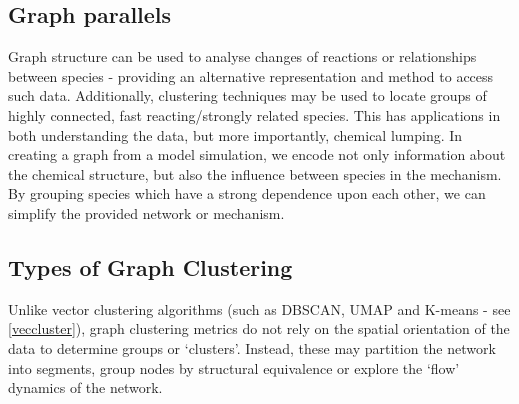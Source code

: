 \subsection{Graph parallels}


Graph structure can be used to analyse changes of reactions or relationships between species - providing an alternative representation and method to access such data. Additionally, clustering techniques may be used to locate groups of highly connected, fast reacting/strongly related species. This has applications in both understanding the data, but more importantly, chemical lumping. In creating a graph from a model simulation, we encode not only information about the chemical structure, but also the influence between species in the mechanism. By grouping species which have a strong dependence upon each other, we can simplify the provided network or mechanism.

 \subsection{Types of Graph Clustering}
Unlike vector clustering algorithms (such as DBSCAN, UMAP and K-means - see \autoref{veccluster}), graph clustering metrics do not rely on the spatial orientation of the data to determine groups or `clusters'. Instead, these may partition the network into segments, group nodes by structural equivalence or explore the `flow' dynamics of the network.

